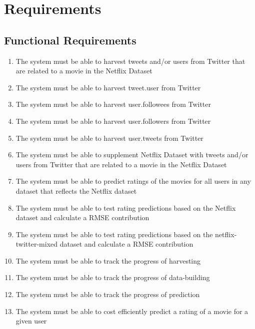 
\appendix
\clearpage
{}
\setcounter{page}{1}



\chapter{Requirements}\label{app:req}
\section{Functional Requirements}
\begin{enumerate}[label=\bfseries FR \arabic*:]
  \item The system must be able to harvest tweets and/or users from Twitter that are related to a movie in the Netflix Dataset
  \item The system must be able to harvest tweet.user from Twitter
  \item The system must be able to harvest user.followees from Twitter
  \item The system must be able to harvest user.followers from Twitter
  \item The system must be able to harvest user.tweets from Twitter
  \item The system must be able to supplement Netflix Dataset with tweets and/or users from Twitter that are related to a movie in the Netflix Dataset
  \item The system must be able to predict ratings of the movies for all users in any dataset that reflects the Netflix dataset
  \item The system must be able to test rating predictions based on the Netflix dataset and calculate a RMSE contribution
  \item The system must be able to test rating predictions based on the netflix-twitter-mixed dataset and calculate a RMSE contribution
  \item The system must be able to track the progress of harvesting
  \item The system must be able to track the progress of data-building
  \item The system must be able to track the progress of prediction
  \item The system must be able to cost efficiently predict a rating of a movie for a given user
\end{enumerate}

